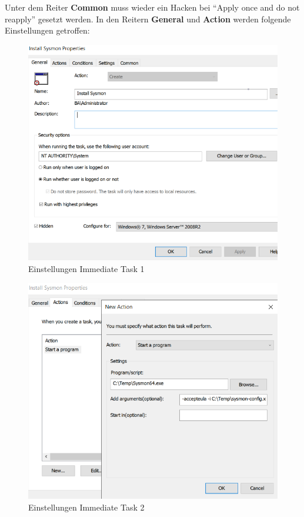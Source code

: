 Unter dem Reiter \textbf{Common} muss wieder ein Hacken bei ``Apply once and do not reapply'' gesetzt werden.
In den Reitern \textbf{General} und \textbf{Action} werden folgende Einstellungen getroffen:\\
\begin{minipage}{0.5\linewidth}
    \begin{figure}[H]
        \centering
        \includegraphics[width=\linewidth]{../img/sysmon/scheduled-task-general.png}
        \caption{Einstellungen Immediate Task 1}
    \end{figure}

\end{minipage}
\begin{minipage}{0.5\linewidth}
    \begin{figure}[H]
        \centering
        \includegraphics[width=\linewidth]{../img/sysmon/scheduled-task-action.png}
        \caption{Einstellungen Immediate Task 2}
    \end{figure}
\end{minipage}\\


